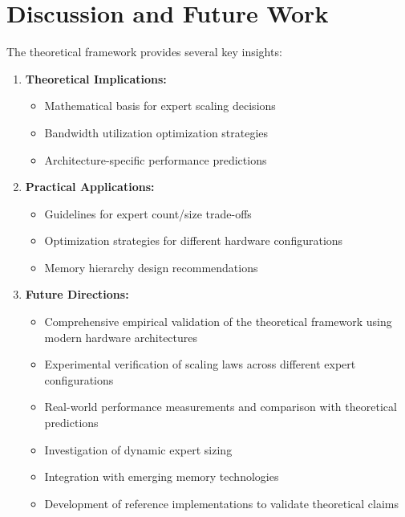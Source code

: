 \documentclass[11pt]{article}
\begin{document}
\section{Discussion and Future Work}

The theoretical framework provides several key insights:

\begin{enumerate}
    \item \textbf{Theoretical Implications:}
    \begin{itemize}
        \item Mathematical basis for expert scaling decisions
        \item Bandwidth utilization optimization strategies
        \item Architecture-specific performance predictions
    \end{itemize}

    \item \textbf{Practical Applications:}
    \begin{itemize}
        \item Guidelines for expert count/size trade-offs
        \item Optimization strategies for different hardware configurations
        \item Memory hierarchy design recommendations
    \end{itemize}

    \item \textbf{Future Directions:}
    \begin{itemize}
        \item Comprehensive empirical validation of the theoretical framework using modern hardware architectures
        \item Experimental verification of scaling laws across different expert configurations
        \item Real-world performance measurements and comparison with theoretical predictions
        \item Investigation of dynamic expert sizing
        \item Integration with emerging memory technologies
        \item Development of reference implementations to validate theoretical claims
    \end{itemize}
\end{enumerate}
\end{document}
